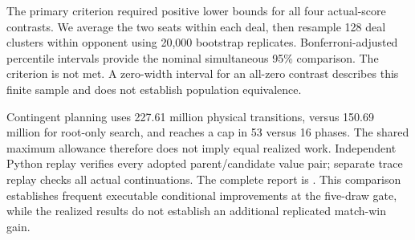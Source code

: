 

The primary criterion required positive lower bounds for all four actual-score
contrasts. We average the two seats within each deal, then resample 128 deal
clusters within opponent using 20,000 bootstrap replicates. Bonferroni-adjusted
percentile intervals provide the nominal simultaneous 95\% comparison.
The criterion is not met. A zero-width interval for an all-zero contrast
describes this finite sample and does not establish population equivalence.

Contingent planning uses 227.61 million physical transitions, versus
150.69 million for root-only search, and reaches a cap in 53 versus 16 phases.
The shared maximum allowance therefore does not imply equal realized work.
Independent Python replay verifies every adopted parent/candidate value pair;
separate trace replay checks all actual continuations. The complete report is
.
This comparison establishes frequent executable conditional improvements at
the five-draw gate, while the realized results do not establish an additional
replicated match-win gain.

